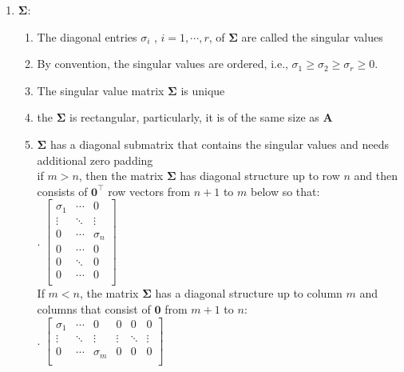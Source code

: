 \begin{enumerate}
    \item $\bm{\Sigma}$:
    \begin{enumerate}
        \item The diagonal entries $\sigma _i$ , $i = 1, \cdots , r$, of $\bm{\Sigma}$  are called the singular values
        \hfill \cite{mfml/book/mml/Deisenroth-Faisal-Ong}

        \item By convention, the singular values are ordered, i.e., $\sigma _1 \geq \sigma _2 \geq \sigma _r \geq 0$.
        \hfill \cite{mfml/book/mml/Deisenroth-Faisal-Ong}

        \item The singular value matrix $\bm{\Sigma}$ is unique
        \hfill \cite{mfml/book/mml/Deisenroth-Faisal-Ong}

        \item the $\bm{\Sigma}$ is rectangular, particularly, it is of the same size as $\bm{A}$
        \hfill \cite{mfml/book/mml/Deisenroth-Faisal-Ong}

        \item $\bm{\Sigma}$ has a diagonal submatrix that contains the singular values and needs additional zero padding
        \hfill \cite{mfml/book/mml/Deisenroth-Faisal-Ong}
        \\
        if $m > n$, then the matrix $\bm{\Sigma}$ has diagonal structure up to row $n$ and then consists of $\bm{0}^\top$ row vectors from $n + 1$ to $m$ below so that:
        \hfill \cite{mfml/book/mml/Deisenroth-Faisal-Ong}
        \\
        .\hfill
        $
            \begin{bmatrix}
                \sigma_1 & \cdots  & 0 \\
                \vdots & \ddots & \vdots \\
                0 & \cdots & \sigma_n \\
                0 & \cdots & 0\\
                0 & \ddots & 0 \\
                0 & \cdots & 0\\
            \end{bmatrix}
        $
        \hfill \cite{mfml/book/mml/Deisenroth-Faisal-Ong}
        \\
        If $m < n$, the matrix $\bm{\Sigma}$ has a diagonal structure up to column $m$ and columns that consist of $\bm{0}$ from $m + 1$ to $n$:
        \hfill \cite{mfml/book/mml/Deisenroth-Faisal-Ong}
        \\
        .\hfill
        $
            \begin{bmatrix}
                \sigma_1 & \cdots  & 0 & 0 & 0 & 0 \\
                \vdots & \ddots & \vdots & \vdots  & \ddots & \vdots \\
                0 & \cdots & \sigma_m & 0 & 0 & 0 \\
            \end{bmatrix}
        $
        \hfill \cite{mfml/book/mml/Deisenroth-Faisal-Ong}
    \end{enumerate}




\end{enumerate}
